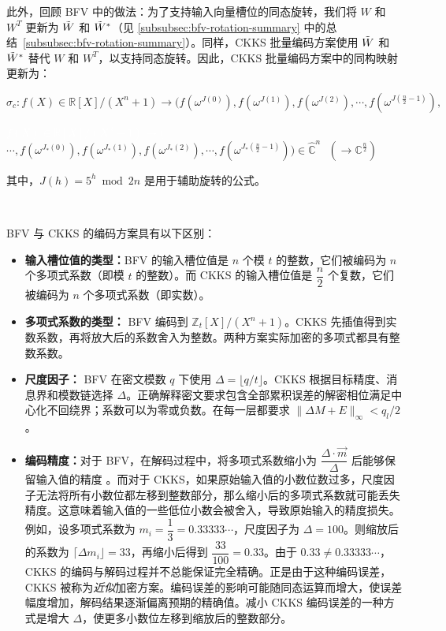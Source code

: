 此外，回顾 BFV 中的做法：为了支持输入向量槽位的同态旋转，我们将 $W$ 和 $W^T$ 更新为 $\tilde W$ 和 $\tilde W^*$（见 \autoref{subsubsec:bfv-rotation-summary} 中的总结~\ref*{subsubsec:bfv-rotation-summary}）。同样，CKKS 批量编码方案使用 $\tilde W$ 和 $\tilde W^*$ 替代 $W$ 和 $W^T$，以支持同态旋转。因此，CKKS 批量编码方案中的同构映射更新为：


$\sigma_c: f(X) \in \mathbb{R}[X]/(X^n + 1) \longrightarrow \bm ( f(\omega^{J(0)}),f(\omega^{J(1)}),f(\omega^{J(2)}), \cdots, f(\omega^{J(\frac{n}{2} - 1)}), $

\textcolor{white}{$ f(X) \in \mathbb{R}[X]/(X^n + 1) \longrightarrow \bm ( $} $\cdots, f(\omega^{J_*(0)}),f(\omega^{J_*(1)}),f(\omega^{J_*(2)}), \cdots, f(\omega^{J_*(\frac{n}{2} - 1)}) \bm) \in \mathbb{\hat{C}}^{n} \text{ } (\longrightarrow \mathbb{C}^{\frac{n}{2}})$

其中，$J(h) = 5^h \bmod 2n$ 是用于辅助旋转的公式。


$ $

BFV 与 CKKS 的编码方案具有以下区别：

\begin{itemize}
\item \textbf{输入槽位值的类型：}BFV 的输入槽位值是 ${n}$ 个模 $t$ 的整数，它们被编码为 $n$ 个多项式系数（即模 $t$ 的整数）。而 CKKS 的输入槽位值是 $\dfrac{n}{2}$ 个复数，它们被编码为 $n$ 个多项式系数（即实数）。

\item \textbf{多项式系数的类型：} BFV 编码到 $\mathbb{Z}_t[X]/(X^n+1)$。CKKS 先插值得到实数系数，再将放大后的系数舍入为整数。两种方案实际加密的多项式都具有整数系数。

\item \textbf{尺度因子：} BFV 在密文模数 $q$ 下使用 $\Delta=\lfloor q/t\rfloor$。CKKS 根据目标精度、消息界和模数链选择 $\Delta$。正确解释密文要求包含全部累积误差的解密相位满足中心化不回绕界；系数可以为零或负数。在每一层都要求 $\|\Delta M+E\|_\infty<q_l/2$。

\item \textbf{编码精度：}对于 BFV，在解码过程中，将多项式系数缩小为 $\dfrac{ \Delta\cdot \vec{m} }{\Delta}$ 后能够保留输入值的精度
。而对于 CKKS，如果原始输入值的小数位数过多，尺度因子无法将所有小数位都左移到整数部分，那么缩小后的多项式系数就可能丢失精度。这意味着输入值的一些低位小数会被舍入，导致原始输入的精度损失。例如，设多项式系数为 $m_i = \dfrac{1}{3} = 0.33333\cdots$，尺度因子为 $\Delta = 100$。则缩放后的系数为 $\lceil \Delta m_i \rfloor = 33$，再缩小后得到 $\dfrac{33}{100} = 0.33$。由于 $0.33 \neq 0.33333\cdots$，CKKS 的编码与解码过程并不总能保证完全精确。正是由于这种编码误差，CKKS 被称为\textit{近似}加密方案。编码误差的影响可能随同态运算而增大，使误差幅度增加，解码结果逐渐偏离预期的精确值。减小 CKKS 编码误差的一种方式是增大 $\Delta$，使更多小数位左移到缩放后的整数部分。

\end{itemize}

